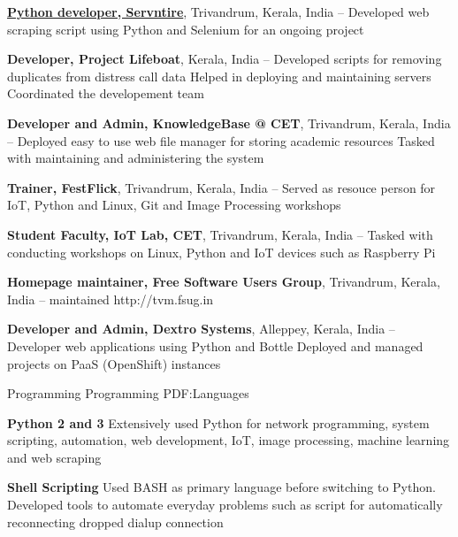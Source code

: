 \documentclass[letterpaper,MMMyyyy,nonstopmode]{simpleresumecv}
\begin{document}
\begin{Body}
\BigGap
\Entry
\href{https://servntire.com/}
{\textbf{Python developer, Servntire}},
Trivandrum, Kerala, India
\hfill
{} -- 
\Gap
\BulletItem
Developed web scraping script using Python and Selenium for an ongoing project

\BigGap
\Entry
{\textbf{Developer, Project Lifeboat}},
Kerala, India
\hfill
{} -- 
\Gap
\BulletItem
Developed scripts for removing duplicates from distress call data
\BulletItem
Helped in deploying and maintaining servers
\BulletItem
Coordinated the developement team

\BigGap
\Entry
{\textbf{Developer and Admin, KnowledgeBase @ CET}},
Trivandrum, Kerala, India
\hfill
{} -- 
\Gap
\BulletItem
Deployed easy to use web file manager for storing academic resources 
\BulletItem
Tasked with maintaining and administering the system

\BigGap
\Entry
{\textbf{Trainer, FestFlick}},
Trivandrum, Kerala, India
\hfill
{} -- 
\Gap
\BulletItem
Served as resouce person for IoT, Python and Linux, Git and Image Processing
workshops

\BigGap
\Entry
{\textbf{Student Faculty, IoT Lab, CET}},
Trivandrum, Kerala, India
\hfill
{} -- 
\Gap
\BulletItem
Tasked with conducting workshops on Linux, Python and IoT devices such as
Raspberry Pi

\BigGap
\Entry
{\textbf{Homepage maintainer, Free Software Users Group}},
Trivandrum, Kerala, India
\hfill
{} -- 
\Gap
\BulletItem
maintained http://tvm.fsug.in

\BigGap
\Entry
{\textbf{Developer and Admin, Dextro Systems}},
Alleppey, Kerala, India
\hfill
{} -- 
\Gap
\BulletItem
Developer web applications using Python and Bottle
\BulletItem
Deployed and managed projects on PaaS (OpenShift) instances 

\BigGap
\Section
{Programming}
{Programming}
{PDF:Languages}

\BulletItem
\textbf{Python 2 and 3}
\SubBulletItem
Extensively used Python for network programming, system scripting, automation,
web development, IoT, image processing, machine learning and web scraping

\BigGap
\BulletItem
\textbf{Shell Scripting}
\SubBulletItem
Used BASH as primary language before switching to Python. Developed tools to
automate everyday problems such as script for automatically reconnecting dropped
dialup connection


\end{Body}
\end{document}
